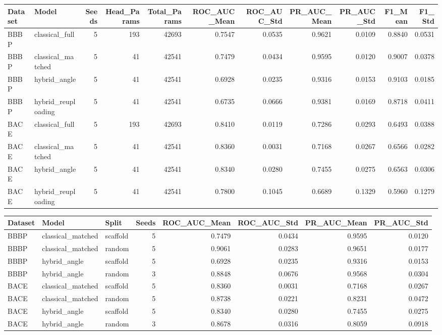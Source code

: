 \begin{tabular}{llrrrrrrrrr}
\toprule
Dataset & Model & Seeds & Head_Params & Total_Params & ROC_AUC_Mean & ROC_AUC_Std & PR_AUC_Mean & PR_AUC_Std & F1_Mean & F1_Std \\
\midrule
BBBP & classical_full & 5 & 193 & 42693 & 0.7547 & 0.0535 & 0.9621 & 0.0109 & 0.8840 & 0.0531 \\
BBBP & classical_matched & 5 & 41 & 42541 & 0.7479 & 0.0434 & 0.9595 & 0.0120 & 0.9007 & 0.0378 \\
BBBP & hybrid_angle & 5 & 41 & 42541 & 0.6928 & 0.0235 & 0.9316 & 0.0153 & 0.9103 & 0.0185 \\
BBBP & hybrid_reuploading & 5 & 41 & 42541 & 0.6735 & 0.0666 & 0.9381 & 0.0169 & 0.8718 & 0.0411 \\
BACE & classical_full & 5 & 193 & 42693 & 0.8410 & 0.0119 & 0.7286 & 0.0293 & 0.6493 & 0.0388 \\
BACE & classical_matched & 5 & 41 & 42541 & 0.8360 & 0.0031 & 0.7168 & 0.0267 & 0.6566 & 0.0282 \\
BACE & hybrid_angle & 5 & 41 & 42541 & 0.8340 & 0.0280 & 0.7455 & 0.0275 & 0.6563 & 0.0306 \\
BACE & hybrid_reuploading & 5 & 41 & 42541 & 0.7800 & 0.1045 & 0.6689 & 0.1329 & 0.5960 & 0.1279 \\
\bottomrule
\end{tabular}


\begin{tabular}{lllrrrrr}
\toprule
Dataset & Model & Split & Seeds & ROC_AUC_Mean & ROC_AUC_Std & PR_AUC_Mean & PR_AUC_Std \\
\midrule
BBBP & classical_matched & scaffold & 5 & 0.7479 & 0.0434 & 0.9595 & 0.0120 \\
BBBP & classical_matched & random & 5 & 0.9061 & 0.0283 & 0.9651 & 0.0177 \\
BBBP & hybrid_angle & scaffold & 5 & 0.6928 & 0.0235 & 0.9316 & 0.0153 \\
BBBP & hybrid_angle & random & 3 & 0.8848 & 0.0676 & 0.9568 & 0.0304 \\
BACE & classical_matched & scaffold & 5 & 0.8360 & 0.0031 & 0.7168 & 0.0267 \\
BACE & classical_matched & random & 5 & 0.8738 & 0.0221 & 0.8231 & 0.0472 \\
BACE & hybrid_angle & scaffold & 5 & 0.8340 & 0.0280 & 0.7455 & 0.0275 \\
BACE & hybrid_angle & random & 3 & 0.8678 & 0.0316 & 0.8059 & 0.0918 \\
\bottomrule
\end{tabular}


